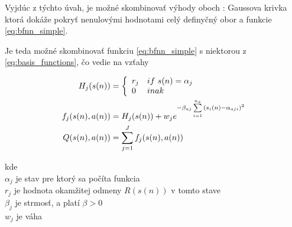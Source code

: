 Vyjdúc z týchto úvah, je možné skombinovať výhody oboch : Gaussova krivka
ktorá dokáže pokryť nenulovými hodnotami celý definyčný obor a funkcie \ref{eq:bfnn_simple}.

Je teda možné skombinovať funkciu \ref{eq:bfnn_simple} s niektorou z \ref{eq:basis_functions},
čo vedie na vzťahy

\begin{align}
H_j(s(n)) &=
\left\{
	\begin{array}{ll}
		r_j  & if \ s(n) = \alpha_j \\
		0 & inak
	\end{array}
\right. \\
  f_j(\boldmath{s(n), a(n)}) &= H_j(s(n)) + w_j e^{ -\beta_{aj} \sum\limits_{i=1}^{n_s}{(s_i(n) - \alpha_{aji})^2 }} \\
  Q(s(n), a(n)) &= \sum\limits_{j=1}^{J} f_j(s(n), a(n))
\end{align}

kde \\
$\alpha_j$ je stav pre ktorý sa počíta funkcia \\
$r_j$ je hodnota okamžitej odmeny $R(s(n))$ v tomto stave \\
$\beta_j$ je strmosť, a platí $\beta > 0$ \\
$w_j$ je váha \\
